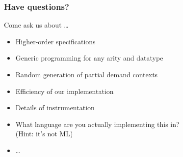 \documentclass{beamer}
\begin{document}

\begin{frame}[fragile]
\frametitle{Have questions?}
Come ask us about \dots
\begin{itemize}
\item Higher-order specifications
\item Generic programming for any arity and datatype
\item Random generation of partial demand contexts
\item Efficiency of our implementation
\item Details of instrumentation
\item What language are you actually implementing this in? \\ (Hint: it's not ML)
\item[] \dots
\end{itemize}
\end{frame}
\end{document}

